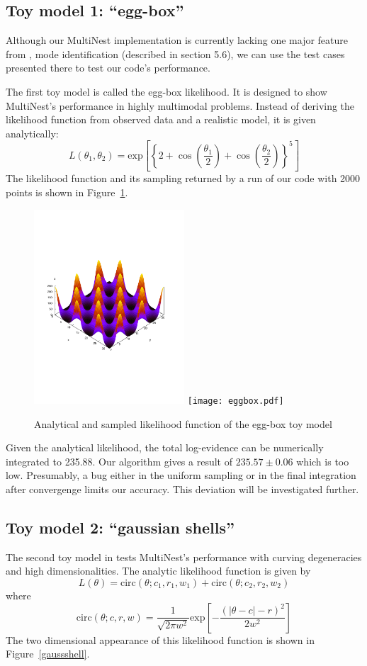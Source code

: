 \documentclass{article}
\begin{document}
\subsection{Toy model 1: ``egg-box''}
Although our MultiNest implementation is currently lacking one major feature from  \cite{2009MNRAS.398.1601F}, mode identification (described in section 5.6), we can use the test cases presented there to test our code's performance.

The first toy model is called the egg-box likelihood. It is designed to show MultiNest's performance in highly multimodal problems. Instead of deriving the likelihood function from observed data and a realistic model, it is given analytically:
\[L(\theta_1,\theta_2) = \mathrm{exp}
\left[\left\{2+\cos\left(\frac{\theta_1}{2}\right)+\cos\left(\frac{\theta_2}{2}\right)\right\}^5\right]\]
The likelihood function and its sampling returned by a run of our code with 2000 points is shown in Figure~\ref{eggbox}.

\begin{figure}
\includegraphics[width=0.5\textwidth]{eggbox_analytic.pdf}
\texttt{[image: eggbox.pdf]}
\caption{Analytical and sampled likelihood function of the egg-box toy model}
\label{eggbox}
\end{figure}

Given the analytical likelihood, the total log-evidence can be numerically integrated to 235.88. Our algorithm gives a result of $235.57\pm 0.06$ which is too low. Presumably, a bug either in the uniform sampling or in the final integration after convergenge limits our accuracy. This deviation will be investigated further.

\subsection{Toy model 2: ``gaussian shells''}
The second toy model in \cite{2009MNRAS.398.1601F} tests MultiNest's performance with curving degeneracies and high dimensionalities. The analytic likelihood function is given by
\[L(\theta) = \mathrm{circ}(\theta;c_1,r_1,w_1)+\mathrm{circ}(\theta;c_2,r_2,w_2)\]
where
\[ \mathrm{circ}(\theta;c,r,w) = \frac{1}{\sqrt{2\pi w^2}}\mathrm{exp}\left[-\frac{(|\theta - c|-r)^2}{2w^2}\right]\]
The two dimensional appearance of this likelihood function is shown in Figure~\ref{gaussshell}.
\end{document}
